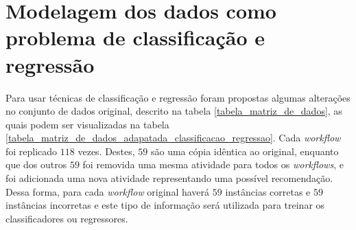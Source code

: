 \section{Modelagem dos dados como problema de classificação e regressão}\label{SEC_MODELAGEM_CLASSIFICACAO_REGRESSAO} 
Para usar técnicas de classificação e regressão foram propostas algumas alterações no conjunto de dados original, descrito na tabela \ref{tabela_matriz_de_dados}, as quais podem ser visualizadas na tabela \ref{tabela_matriz_de_dados_adapatada_classificacao_regressao}. Cada \emph{workflow} foi replicado \(118\) vezes. Destes, \(59\) são uma cópia idêntica ao original, enquanto que dos outros \(59\) foi removida uma mesma atividade para todos os \emph{workflows}, e foi adicionada uma nova atividade representando uma possível recomendação. Dessa forma, para cada \emph{workflow} original haverá \(59\) instâncias corretas e \(59\) instâncias incorretas e este tipo de informação será utilizada para treinar os classificadores ou regressores.
